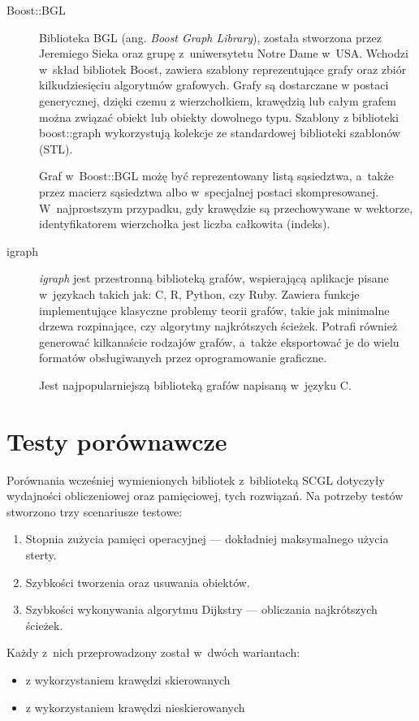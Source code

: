 \documentclass[a4paper,12pt,polish,oneside]{thesis}
\begin{document}
\begin{description}
\item[Boost::BGL]
Biblioteka BGL (ang. \emph{Boost Graph Library}), została stworzona przez Jeremiego Sieka oraz grupę z~uniwersytetu Notre Dame w~USA.
Wchodzi w~skład bibliotek Boost, zawiera szablony reprezentujące grafy oraz zbiór kilkudziesięciu algorytmów grafowych.
Grafy są dostarczane w postaci generycznej, dzięki czemu z wierzchołkiem, krawędzią lub całym grafem można związać obiekt lub obiekty dowolnego typu.
Szablony z biblioteki boost::graph wykorzystują kolekcje ze standardowej biblioteki szablonów (STL).

Graf w~Boost::BGL możę być reprezentowany listą sąsiedztwa, a~także przez macierz sąsiedztwa albo w~specjalnej postaci skompresowanej.
W~najprostszym przypadku, gdy krawędzie są przechowywane w wektorze, identyfikatorem wierzchołka jest liczba całkowita (indeks).

\item[igraph]
\emph{igraph} jest przestronną biblioteką grafów, wspierającą aplikacje pisane w~językach takich jak: C, R, Python, czy Ruby.
Zawiera funkcje implementujące klasyczne problemy teorii grafów, takie jak minimalne drzewa rozpinające, czy algorytmy najkrótszych ścieżek.
Potrafi również generować kilkanaście rodzajów grafów, a~także eksportować je do wielu formatów obsługiwanych przez oprogramowanie graficzne.

Jest najpopularniejszą biblioteką grafów napisaną w~języku C.
\end{description}

\section{Testy porównawcze}
Porównania wcześniej wymienionych bibliotek z~biblioteką SCGL dotyczyły wydajności obliczeniowej oraz pamięciowej, tych rozwiązań.
Na potrzeby testów stworzono trzy scenariusze testowe:
\begin{enumerate}
	\item Stopnia zużycia pamięci operacyjnej --- dokładniej maksymalnego użycia sterty.
	\item Szybkości tworzenia oraz usuwania obiektów.
	\item Szybkości wykonywania algorytmu Dijkstry --- obliczania najkrótszych ścieżek.
\end{enumerate}
Każdy z~nich przeprowadzony został w~dwóch wariantach:
\begin{itemize}
	\item z wykorzystaniem krawędzi skierowanych
	\item z wykorzystaniem krawędzi nieskierowanych
\end{itemize}
\end{document}
